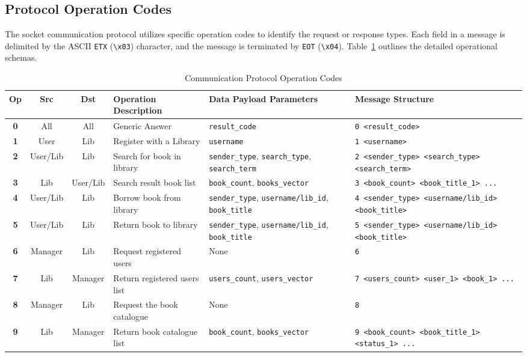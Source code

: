 \documentclass[11pt, a4paper]{article}
\begin{document}
\subsection{Protocol Operation Codes}
The socket communication protocol utilizes specific operation codes to identify the request or response types. Each field in a message is delimited by the ASCII \texttt{ETX} (\texttt{\textbackslash{}x03}) character, and the message is terminated by \texttt{EOT} (\texttt{\textbackslash{}x04}). Table~\ref{tab:op_codes} outlines the detailed operational schemas.

\begin{table}[h!]
\centering
\footnotesize
\begin{tabular}{|c|c|c|l|p{3.2cm}|p{4.2cm}|}
\hline
\textbf{Op} & \textbf{Src} & \textbf{Dst} & \textbf{Operation Description} & \textbf{Data Payload Parameters} & \textbf{Message Structure} \\ \hline
\textbf{0} & All & All & Generic Answer & \texttt{result\_code} & \texttt{0 \textbar{} <result\_code>} \\ \hline
\textbf{1} & User & Lib & Register with a Library & \texttt{username} & \texttt{1 \textbar{} <username>} \\ \hline
\textbf{2} & User/Lib & Lib & Search for book in library & \texttt{sender\_type}, \texttt{search\_type}, \texttt{search\_term} & \texttt{2 \textbar{} <sender\_type> \textbar{} <search\_type> \textbar{} <search\_term>} \\ \hline
\textbf{3} & Lib & User/Lib & Search result book list & \texttt{book\_count}, \texttt{books\_vector} & \texttt{3 \textbar{} <book\_count> \textbar{} <book\_title\_1> \textbar{} ...} \\ \hline
\textbf{4} & User/Lib & Lib & Borrow book from library & \texttt{sender\_type}, \texttt{username/lib\_id}, \texttt{book\_title} & \texttt{4 \textbar{} <sender\_type> \textbar{} <username/lib\_id> \textbar{} <book\_title>} \\ \hline
\textbf{5} & User/Lib & Lib & Return book to library & \texttt{sender\_type}, \texttt{username/lib\_id}, \texttt{book\_title} & \texttt{5 \textbar{} <sender\_type> \textbar{} <username/lib\_id> \textbar{} <book\_title>} \\ \hline
\textbf{6} & Manager & Lib & Request registered users & None & \texttt{6} \\ \hline
\textbf{7} & Lib & Manager & Return registered users list & \texttt{users\_count}, \texttt{users\_vector} & \texttt{7 \textbar{} <users\_count> \textbar{} <user\_1> \textbar{} <book\_1> \textbar{} ...} \\ \hline
\textbf{8} & Manager & Lib & Request the book catalogue & None & \texttt{8} \\ \hline
\textbf{9} & Lib & Manager & Return book catalogue list & \texttt{book\_count}, \texttt{books\_vector} & \texttt{9 \textbar{} <book\_count> \textbar{} <book\_title\_1> \textbar{} <status\_1> \textbar{} ...} \\ \hline
\end{tabular}
\caption{Communication Protocol Operation Codes}
\label{tab:op_codes}
\end{table}
\end{document}
